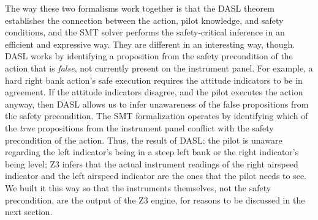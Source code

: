 The way these two formalisms work together is that the DASL theorem establishes the connection between the action, pilot knowledge, and safety conditions, and the SMT solver performs the safety-critical inference in an efficient and expressive way. They are different in an interesting way, though. DASL works by identifying a proposition from the safety precondition of the action that is \emph{false}, not currently present on the instrument panel. For example, a hard right bank action's safe execution requires the attitude indicators to be in agreement. If the attitude indicators disagree, and the pilot executes the action anyway, then DASL allows us to infer unawareness of the false propositions from the safety precondition. The SMT formalization operates by identifying which of the \emph{true} propositions from the instrument panel conflict with the safety precondition of the action. Thus, the result of DASL: the pilot is unaware regarding the left indicator's being in a steep left bank or the right indicator's being level; Z3 infers that the actual instrument readings of the right airspeed indicator and the left airspeed indicator are the ones that the pilot needs to see. We built it this way so that the instruments themselves, not the safety precondition, are the output of the Z3 engine, for reasons to be discussed in the next section.



